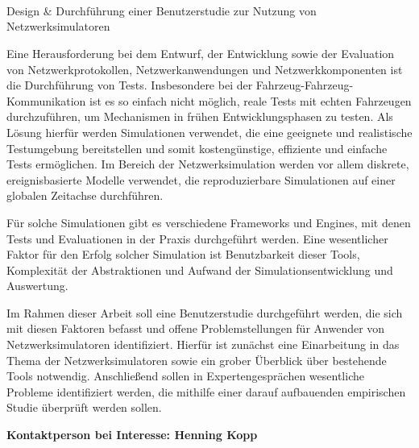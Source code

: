 \documentclass[german]{thesistopic}	%
\begin{document}
\begin{letter}{~\\~\\~\\\vspace*{3cm}}


\opening{\newline
Design \& Durchführung einer Benutzerstudie zur Nutzung von Netzwerksimulatoren}


Eine Herausforderung bei dem Entwurf, der Entwicklung sowie der Evaluation von Netzwerkprotokollen, Netzwerkanwendungen und Netzwerkkomponenten ist die Durchführung von Tests.
Insbesondere bei der Fahrzeug-Fahrzeug-Kommunikation ist es so einfach nicht möglich, reale Tests mit echten Fahrzeugen durchzuführen, um Mechanismen in frühen Entwicklungsphasen zu testen.
Als Lösung hierfür werden Simulationen verwendet, die eine geeignete und realistische Testumgebung bereitstellen und somit kostengünstige, effiziente und einfache Tests ermöglichen. Im Bereich der Netzwerksimulation werden vor allem diskrete, ereignisbasierte Modelle verwendet, die reproduzierbare Simulationen auf einer globalen Zeitachse durchführen. 

Für solche Simulationen gibt es verschiedene Frameworks und Engines, mit denen Tests und Evaluationen in der Praxis durchgeführt werden. Eine wesentlicher Faktor für den Erfolg solcher Simulation ist Benutzbarkeit dieser Tools, Komplexität der Abstraktionen und Aufwand der Simulationsentwicklung und Auswertung. 

Im Rahmen dieser Arbeit soll eine Benutzerstudie durchgeführt werden, die sich mit diesen Faktoren befasst und offene Problemstellungen für Anwender von Netzwerksimulatoren identifiziert. Hierfür ist zunächst eine Einarbeitung in das Thema der Netzwerksimulatoren sowie ein grober Überblick über bestehende Tools notwendig. Anschließend sollen in Expertengesprächen wesentliche Probleme identifiziert werden, die mithilfe einer darauf aufbauenden empirischen Studie überprüft werden sollen.
\bigskip

\textbf{Kontaktperson bei Interesse: Henning Kopp} \\

\end{letter}
\end{document}
